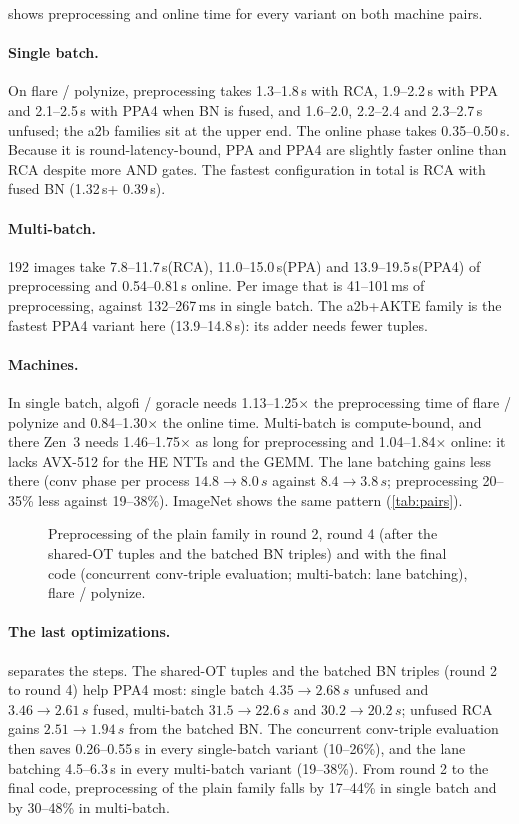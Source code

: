 \documentclass[10pt,a4paper]{article}
\newcommand{\ms}{\,ms\xspace}
\newcommand{\s}{\,s\xspace}
\begin{document}
 shows preprocessing and online time for every variant on both machine pairs.

\paragraph{Single batch.} On flare / polynize, preprocessing takes 1.3--1.8\s with RCA,
1.9--2.2\s with PPA and 2.1--2.5\s with PPA4 when BN is fused, and 1.6--2.0, 2.2--2.4 and 2.3--2.7\s
unfused; the a2b families sit at the upper end. The online phase takes 0.35--0.50\s. Because it is
round-latency-bound, PPA and PPA4 are slightly faster online than RCA despite more AND gates. The fastest
configuration in total is RCA with fused BN (1.32\s + 0.39\s).

\paragraph{Multi-batch.} 192 images take 7.8--11.7\s (RCA), 11.0--15.0\s (PPA) and 13.9--19.5\s (PPA4)
of preprocessing and 0.54--0.81\s online. Per image that is 41--101\ms of preprocessing, against 132--267\ms in single batch.
The a2b+AKTE family is the fastest PPA4 variant here (13.9--14.8\s): its adder needs fewer tuples.

\paragraph{Machines.} In single batch, algofi / goracle needs 1.13--1.25$\times$ the preprocessing time of flare / polynize
and 0.84--1.30$\times$ the online time. Multi-batch is compute-bound, and there Zen~3 needs 1.46--1.75$\times$ as long for
preprocessing and 1.04--1.84$\times$ online: it lacks AVX-512 for the HE NTTs and the GEMM. The lane batching gains less there
(conv phase per process $14.8\to8.0\s$ against $8.4\to3.8\s$; preprocessing 20--35\% less against 19--38\%).
ImageNet shows the same pattern (\cref{tab:pairs}).

\begin{figure}[t]
  \centering
  \caption{Preprocessing of the plain family in round 2, round 4 (after the shared-OT tuples and the
  batched BN triples) and with the final code (concurrent conv-triple evaluation; multi-batch: lane batching), flare / polynize.}
  \label{fig:r2r4}
\end{figure}

\paragraph{The last optimizations.}  separates the steps. The shared-OT tuples and the batched BN triples
(round 2 to round 4) help PPA4 most: single batch $4.35\to2.68\s$ unfused and $3.46\to2.61\s$ fused, multi-batch
$31.5\to22.6\s$ and $30.2\to20.2\s$; unfused RCA gains $2.51\to1.94\s$ from the batched BN. The concurrent conv-triple
evaluation then saves 0.26--0.55\s in every single-batch variant (10--26\%), and the lane batching 4.5--6.3\s in every
multi-batch variant (19--38\%). From round 2 to the final code, preprocessing of the plain family falls by 17--44\% in single
batch and by 30--48\% in multi-batch.
\end{document}
